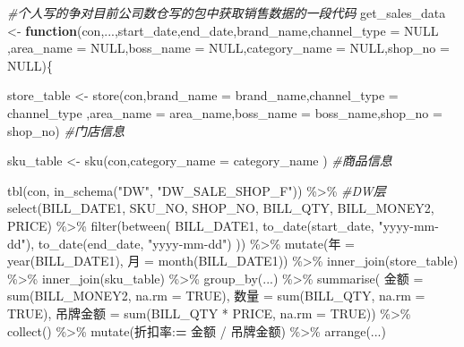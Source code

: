 \documentclass[
]{book}
\newenvironment{Shaded}{\begin{snugshade}}{\end{snugshade}}
\newcommand{\AttributeTok}[1]{\textcolor[rgb]{0.77,0.63,0.00}{#1}}
\newcommand{\CommentTok}[1]{\textcolor[rgb]{0.56,0.35,0.01}{\textit{#1}}}
\newcommand{\ConstantTok}[1]{\textcolor[rgb]{0.00,0.00,0.00}{#1}}
\newcommand{\ControlFlowTok}[1]{\textcolor[rgb]{0.13,0.29,0.53}{\textbf{#1}}}
\newcommand{\ErrorTok}[1]{\textcolor[rgb]{0.64,0.00,0.00}{\textbf{#1}}}
\newcommand{\FunctionTok}[1]{\textcolor[rgb]{0.00,0.00,0.00}{#1}}
\newcommand{\NormalTok}[1]{#1}
\newcommand{\OtherTok}[1]{\textcolor[rgb]{0.56,0.35,0.01}{#1}}
\newcommand{\SpecialCharTok}[1]{\textcolor[rgb]{0.00,0.00,0.00}{#1}}
\newcommand{\StringTok}[1]{\textcolor[rgb]{0.31,0.60,0.02}{#1}}
\begin{document}
\begin{Shaded}
\begin{Highlighting}[]
\CommentTok{\#个人写的争对目前公司数仓写的包中获取销售数据的一段代码}
\NormalTok{get\_sales\_data }\OtherTok{\textless{}{-}} \ControlFlowTok{function}\NormalTok{(con,...,start\_date,end\_date,brand\_name,}\AttributeTok{channel\_type =} \ConstantTok{NULL}\NormalTok{ ,}\AttributeTok{area\_name =} \ConstantTok{NULL}\NormalTok{,}\AttributeTok{boss\_name =} \ConstantTok{NULL}\NormalTok{,}\AttributeTok{category\_name =} \ConstantTok{NULL}\NormalTok{,}\AttributeTok{shop\_no =} \ConstantTok{NULL}\NormalTok{)\{}

\NormalTok{  store\_table }\OtherTok{\textless{}{-}} \FunctionTok{store}\NormalTok{(con,}\AttributeTok{brand\_name =}\NormalTok{ brand\_name,}\AttributeTok{channel\_type =}\NormalTok{ channel\_type ,}\AttributeTok{area\_name =}\NormalTok{ area\_name,}\AttributeTok{boss\_name =}\NormalTok{ boss\_name,}\AttributeTok{shop\_no =}\NormalTok{ shop\_no) }\CommentTok{\#门店信息}
  
\NormalTok{  sku\_table }\OtherTok{\textless{}{-}} \FunctionTok{sku}\NormalTok{(con,}\AttributeTok{category\_name =}\NormalTok{  category\_name ) }\CommentTok{\#商品信息}
  
  \FunctionTok{tbl}\NormalTok{(con, }\FunctionTok{in\_schema}\NormalTok{(}\StringTok{"DW"}\NormalTok{, }\StringTok{"DW\_SALE\_SHOP\_F"}\NormalTok{)) }\SpecialCharTok{\%\textgreater{}\%} \CommentTok{\#DW层}
    \FunctionTok{select}\NormalTok{(BILL\_DATE1, SKU\_NO, SHOP\_NO, BILL\_QTY, BILL\_MONEY2, PRICE) }\SpecialCharTok{\%\textgreater{}\%}
    \FunctionTok{filter}\NormalTok{(}\FunctionTok{between}\NormalTok{(}
\NormalTok{      BILL\_DATE1, }\FunctionTok{to\_date}\NormalTok{(start\_date, }\StringTok{"yyyy{-}mm{-}dd"}\NormalTok{),}
      \FunctionTok{to\_date}\NormalTok{(end\_date, }\StringTok{"yyyy{-}mm{-}dd"}\NormalTok{)}
\NormalTok{    )) }\SpecialCharTok{\%\textgreater{}\%}
    \FunctionTok{mutate}\NormalTok{(年 }\OtherTok{=} \FunctionTok{year}\NormalTok{(BILL\_DATE1), 月 }\OtherTok{=} \FunctionTok{month}\NormalTok{(BILL\_DATE1)) }\SpecialCharTok{\%\textgreater{}\%}
    \FunctionTok{inner\_join}\NormalTok{(store\_table) }\SpecialCharTok{\%\textgreater{}\%}
    \FunctionTok{inner\_join}\NormalTok{(sku\_table) }\SpecialCharTok{\%\textgreater{}\%}
    \FunctionTok{group\_by}\NormalTok{(...) }\SpecialCharTok{\%\textgreater{}\%}
    \FunctionTok{summarise}\NormalTok{(}
\NormalTok{      金额 }\OtherTok{=} \FunctionTok{sum}\NormalTok{(BILL\_MONEY2, }\AttributeTok{na.rm =} \ConstantTok{TRUE}\NormalTok{),}
\NormalTok{      数量 }\OtherTok{=} \FunctionTok{sum}\NormalTok{(BILL\_QTY, }\AttributeTok{na.rm =} \ConstantTok{TRUE}\NormalTok{),}
\NormalTok{      吊牌金额 }\OtherTok{=} \FunctionTok{sum}\NormalTok{(BILL\_QTY }\SpecialCharTok{*}\NormalTok{ PRICE, }\AttributeTok{na.rm =} \ConstantTok{TRUE}\NormalTok{)) }\SpecialCharTok{\%\textgreater{}\%}
    \FunctionTok{collect}\NormalTok{() }\SpecialCharTok{\%\textgreater{}\%}
    \FunctionTok{mutate}\NormalTok{(折扣率}\SpecialCharTok{:}\ErrorTok{=}\NormalTok{ 金额 }\SpecialCharTok{/}\NormalTok{ 吊牌金额) }\SpecialCharTok{\%\textgreater{}\%} 
    \FunctionTok{arrange}\NormalTok{(...)}



\end{Highlighting}
\end{Shaded}
\end{document}
